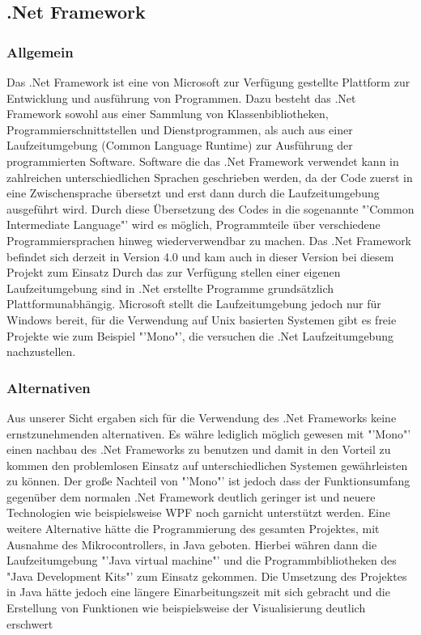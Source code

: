 \subsection{.Net Framework}
\subsubsection{Allgemein}
Das .Net Framework ist eine von Microsoft zur Verfügung gestellte Plattform zur Entwicklung und ausführung von Programmen. Dazu  besteht das .Net Framework sowohl aus einer Sammlung von Klassenbibliotheken, Programmierschnittstellen und Dienstprogrammen, als auch aus einer Laufzeitumgebung (Common Language Runtime) zur Ausführung der programmierten Software.
Software die das .Net Framework verwendet kann in zahlreichen unterschiedlichen Sprachen geschrieben werden, da der Code zuerst in eine Zwischensprache übersetzt und erst dann durch die Laufzeitumgebung ausgeführt wird. Durch diese Übersetzung des Codes in die sogenannte "'Common Intermediate Language"' wird es möglich, Programmteile über verschiedene Programmiersprachen hinweg wiederverwendbar zu machen. 
Das .Net Framework befindet sich derzeit in Version 4.0 und kam auch in dieser Version bei diesem Projekt zum Einsatz
Durch das zur Verfügung stellen einer eigenen Laufzeitumgebung sind in .Net erstellte Programme grundsätzlich Plattformunabhängig. Microsoft stellt die Laufzeitumgebung jedoch nur für Windows bereit, für die Verwendung auf Unix basierten Systemen gibt es freie Projekte wie zum Beispiel "'Mono"', die versuchen die .Net Laufzeitumgebung nachzustellen.

\subsubsection{Alternativen}
Aus unserer Sicht ergaben sich für die Verwendung des .Net Frameworks keine ernstzunehmenden alternativen. Es währe lediglich möglich gewesen  mit "'Mono"' einen nachbau des .Net Frameworks zu benutzen und damit in den Vorteil zu kommen den problemlosen Einsatz auf unterschiedlichen Systemen gewährleisten zu können. Der große Nachteil von "'Mono"' ist jedoch dass der Funktionsumfang gegenüber dem normalen .Net Framework deutlich geringer ist und neuere Technologien wie beispielsweise WPF noch garnicht unterstützt werden. 
Eine weitere Alternative hätte die Programmierung des gesamten Projektes, mit Ausnahme des Mikrocontrollers, in Java geboten. Hierbei währen dann die Laufzeitumgebung "'Java virtual machine"' und die Programmbibliotheken des "Java Development Kits"' zum Einsatz gekommen. Die Umsetzung des Projektes in Java hätte jedoch eine längere Einarbeitungszeit mit sich gebracht und die Erstellung von Funktionen wie beispielsweise der Visualisierung deutlich erschwert

